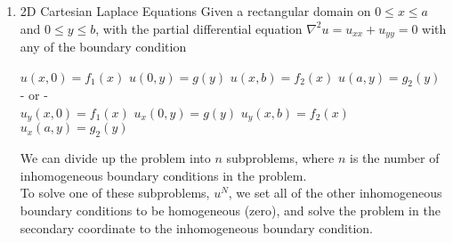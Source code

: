 \documentclass{article}
\begin{document}
\begin{enumerate}
\[\begin{cases}
            h(x+ct) & d \leq x+ct \leq b \\
            0 & x+ct < a, x+ct > b
        \end{cases}
        \right]
    \]
    \[
        u(x,t) = \frac{1}{2}\left[
        \begin{cases}
            g(x-ct) & a+ct \leq x < d + ct\\
            h(x-ct) & d+ct \leq x \leq b + ct\\
            0 & x < a+ct, x > b+ct
        \end{cases}
        +
        \begin{cases}
            g(x+ct) & a-ct \leq x < d-ct \\
            h(x+ct) & d-ct \leq x \leq b-ct \\
            0 & x-ct < a, x > b - ct
        \end{cases}
        \right]
    \]
    This provides us with an easily attainable graphical interpretation of the solution.
    
\pagebreak
    \item 2D Cartesian Laplace Equations
    Given a rectangular domain on $0 \leq x \leq a$ and $0 \leq y \leq b$, with the partial differential equation $\nabla^2u = u_{xx} + u_{yy} = 0$ with any of the boundary condition
    \begin{center}
        $u(x, 0) = f_1(x)$ \hspace{3em} $u(0, y) = g(y)$ \hspace{3em} $u(x, b) = f_2(x)$ \hspace{3em} $u(a, y) = g_2(y)$
        \medskip\\
        - or -
        \medskip\\
        $u_y(x, 0) = f_1(x)$ \hspace{3em} $u_x(0, y) = g(y)$ \hspace{3em} $u_y(x, b) = f_2(x)$ \hspace{3em} $u_x(a, y) = g_2(y)$
    \end{center}
    We can divide up the problem into $n$ subproblems, where $n$ is the number of inhomogeneous boundary conditions in the problem.
    \bigskip\\
    To solve one of these subproblems, $u^N$, we set all of the other inhomogeneous boundary conditions to be homogeneous (zero), and solve the problem in the secondary coordinate to the inhomogeneous boundary condition.
    \bigskip\\\
    

\end{enumerate}
\end{document}
